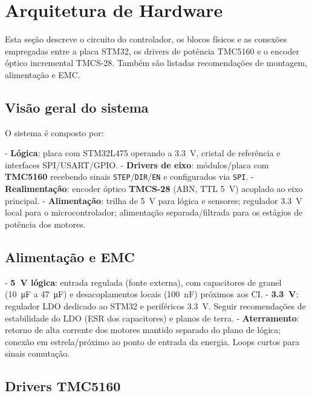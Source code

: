 \section{Arquitetura de Hardware}\label{sec:arq_hw}

Esta se\c{c}\~ao descreve o circuito do controlador, os blocos f\'isicos
e as conex\~oes empregadas entre a placa STM32, os drivers de pot\^encia
TMC5160 e o encoder \'{o}ptico incremental TMCS-28. Tamb\'em s\~ao listadas
recomenda\c{c}\~oes de montagem, alimenta\c{c}\~ao e EMC.

\subsection{Vis\~ao geral do sistema}

O sistema \'e composto por:

- \textbf{L\'ogica}: placa com STM32L475 operando a \SI{3.3}{V}, cristal de
  refer\^encia e interfaces SPI/USART/GPIO.
- \textbf{Drivers de eixo}: m\'odulos/placa com \textbf{TMC5160} recebendo
  sinais \texttt{STEP}/\texttt{DIR}/\texttt{EN} e configurados via \texttt{SPI}.
- \textbf{Realimenta\c{c}\~ao}: encoder \'{o}ptico \textbf{TMCS-28} (ABN, TTL
  \SI{5}{V}) acoplado ao eixo principal.
- \textbf{Alimenta\c{c}\~ao}: trilha de \SI{5}{V} para l\'ogica e sensores;
  regulador \SI{3.3}{V} local para o microcontrolador; alimenta\c{c}\~ao separada/filtrada
  para os est\'agios de pot\^encia dos motores.

\subsection{Alimenta\c{c}\~ao e EMC}

- \textbf{\SI{5}{V} l\'ogica}: entrada regulada (fonte externa), com
  capacitores de granel (\SI{10}{\micro F} a \SI{47}{\micro F}) e
  desacoplamentos locais (\SI{100}{nF}) pr\'oximos aos CI.
- \textbf{\SI{3.3}{V}}: regulador LDO dedicado ao STM32 e perif\'ericos
  \SI{3.3}{V}. Seguir recomenda\c{c}\~oes de estabilidade do LDO (ESR dos
  capacitores) e planos de terra.
- \textbf{Aterramento}: retorno de alta corrente dos motores mantido
  separado do plano de l\'ogica; conex\~ao em estrela/pr\'oximo ao ponto de
  entrada da energia. Loops curtos para sinais comuta\c{c}\~ao.

\subsection{Drivers TMC5160}

